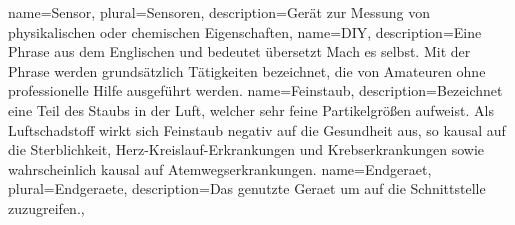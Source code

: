 \makenoidxglossaries
{}
{
	name=Sensor,
	plural=Sensoren,
	description={Gerät zur Messung von physikalischen oder chemischen Eigenschaften},
}
{
	name=DIY,
	description={Eine Phrase aus dem Englischen und bedeutet übersetzt Mach es selbst. Mit der Phrase werden grundsätzlich Tätigkeiten bezeichnet, die von Amateuren ohne professionelle Hilfe ausgeführt werden.}
}
{
	name=Feinstaub,
	description={Bezeichnet eine Teil des Staubs in der Luft, welcher sehr feine Partikelgrößen aufweist. Als Luftschadstoff wirkt sich Feinstaub negativ auf die Gesundheit aus, so kausal auf die Sterblichkeit, Herz-Kreislauf-Erkrankungen und Krebserkrankungen sowie wahrscheinlich kausal auf Atemwegserkrankungen.}
}
 {
	name=Endgeraet,
	plural=Endgeraete,
    description={Das genutzte Geraet um auf die Schnittstelle zuzugreifen.},
}

